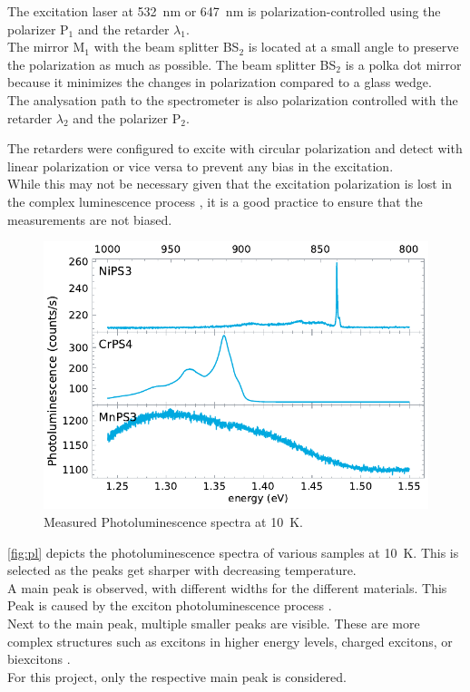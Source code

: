 \documentclass[
	oneside,
	parskip=half,
	a4paper,
]{scrbook}
\begin{document}
The excitation laser at \SI{532}{nm} or \SI{647}{nm} is polarization-controlled using the polarizer P$_1$ and the retarder $\lambda_1$.\\
The mirror M$_1$ with the beam splitter BS$_2$ is located at a small angle to preserve the polarization as much as possible.
The beam splitter BS$_2$ is a polka dot mirror because it minimizes the changes in polarization compared to a glass wedge.\\
The analysation path to the spectrometer is also polarization controlled with the retarder $\lambda_2$ and the polarizer P$_2$.

The retarders were configured to excite with circular polarization and detect with linear polarization or vice versa to prevent any bias in the excitation.\\
While this may not be necessary given that the excitation polarization is lost in the complex luminescence process \cite{NiPS3_linear}, it is a good practice to ensure that the measurements are not biased.

\begin{figure}
	\centering
	\includegraphics{../figures/2023-12-10 Combined PL.pdf}
	\caption{Measured Photoluminescence spectra at \SI{10}{K}.}
	\label{fig:pl}
\end{figure}
\autoref{fig:pl} depicts the photoluminescence spectra of various samples at \SI{10}{K}.
This is selected as the peaks get sharper with decreasing temperature.\\
A main peak is observed, with different widths for the different materials. 
This Peak is caused by the exciton photoluminescence process \cite{NiPS3_exciton,CrPS4_pl}.\\
Next to the main peak, multiple smaller peaks are visible.
These are more complex structures such as excitons in higher energy levels, charged excitons, or biexcitons \cite{CrPS4_pl, NiPS3_exciton,NiPS3_anisotropic, NiPS3_coherent}.\\
For this project, only the respective main peak is considered.
\end{document}
